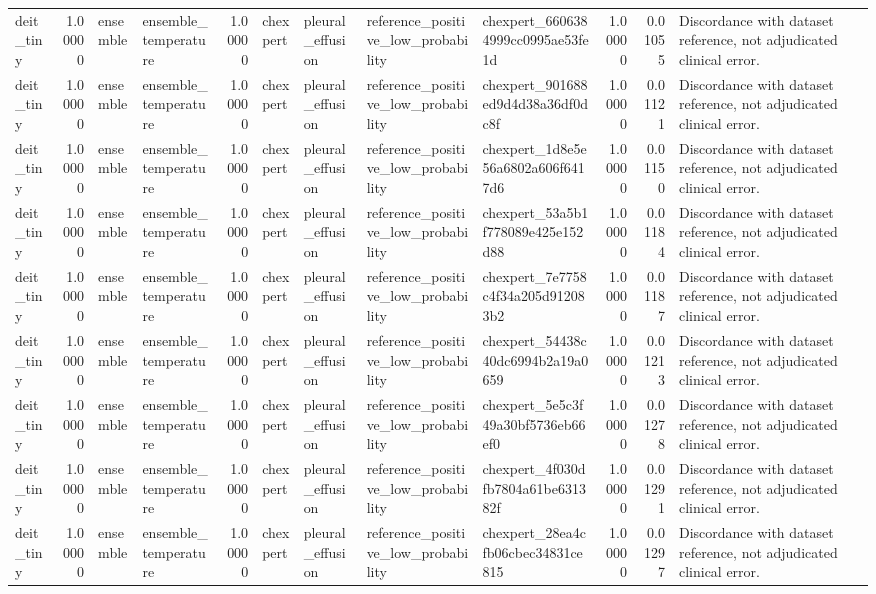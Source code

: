 \begin{tabular}{lrllrllllrrl}
deit\_tiny & 1.00000 & ensemble & ensemble\_temperature & 1.00000 & chexpert & pleural\_effusion & reference\_positive\_low\_probability & chexpert\_6606384999cc0995ae53fe1d & 1.00000 & 0.01055 & Discordance with dataset reference, not adjudicated clinical error. \\
deit\_tiny & 1.00000 & ensemble & ensemble\_temperature & 1.00000 & chexpert & pleural\_effusion & reference\_positive\_low\_probability & chexpert\_901688ed9d4d38a36df0dc8f & 1.00000 & 0.01121 & Discordance with dataset reference, not adjudicated clinical error. \\
deit\_tiny & 1.00000 & ensemble & ensemble\_temperature & 1.00000 & chexpert & pleural\_effusion & reference\_positive\_low\_probability & chexpert\_1d8e5e56a6802a606f6417d6 & 1.00000 & 0.01150 & Discordance with dataset reference, not adjudicated clinical error. \\
deit\_tiny & 1.00000 & ensemble & ensemble\_temperature & 1.00000 & chexpert & pleural\_effusion & reference\_positive\_low\_probability & chexpert\_53a5b1f778089e425e152d88 & 1.00000 & 0.01184 & Discordance with dataset reference, not adjudicated clinical error. \\
deit\_tiny & 1.00000 & ensemble & ensemble\_temperature & 1.00000 & chexpert & pleural\_effusion & reference\_positive\_low\_probability & chexpert\_7e7758c4f34a205d912083b2 & 1.00000 & 0.01187 & Discordance with dataset reference, not adjudicated clinical error. \\
deit\_tiny & 1.00000 & ensemble & ensemble\_temperature & 1.00000 & chexpert & pleural\_effusion & reference\_positive\_low\_probability & chexpert\_54438c40dc6994b2a19a0659 & 1.00000 & 0.01213 & Discordance with dataset reference, not adjudicated clinical error. \\
deit\_tiny & 1.00000 & ensemble & ensemble\_temperature & 1.00000 & chexpert & pleural\_effusion & reference\_positive\_low\_probability & chexpert\_5e5c3f49a30bf5736eb66ef0 & 1.00000 & 0.01278 & Discordance with dataset reference, not adjudicated clinical error. \\
deit\_tiny & 1.00000 & ensemble & ensemble\_temperature & 1.00000 & chexpert & pleural\_effusion & reference\_positive\_low\_probability & chexpert\_4f030dfb7804a61be631382f & 1.00000 & 0.01291 & Discordance with dataset reference, not adjudicated clinical error. \\
deit\_tiny & 1.00000 & ensemble & ensemble\_temperature & 1.00000 & chexpert & pleural\_effusion & reference\_positive\_low\_probability & chexpert\_28ea4cfb06cbec34831ce815 & 1.00000 & 0.01297 & Discordance with dataset reference, not adjudicated clinical error. \\

\end{tabular}
